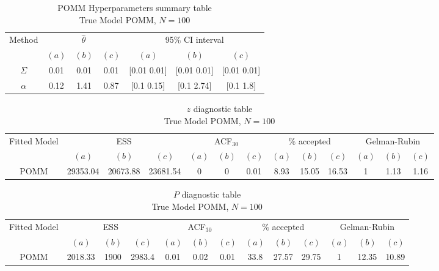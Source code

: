 \documentclass[11pt]{amsart}
\begin{document}
\begin{table}[htbp]
\centering
\caption*{
{\large POMM Hyperparameters summary table} \\ 
{\small True Model POMM, $N=100$}
} 
\begin{tabular}{ccccccc}
\toprule
\multirow{2}{*}{Method} & \multicolumn{3}{c}{
$\hat{\theta}$} & \multicolumn{3}{c}{
95$\%$ CI interval}  \\
\cmidrule(lr){2-4} \cmidrule(lr){5-7} 
& $(a)$ & $(b)$ & $(c)$ & $(a)$ & $(b)$ & $(c)$  \\
\midrule
$\Sigma$ &0.01 & 0.01 & 0.01 & [0.01	0.01] & [0.01	0.01] & [0.01	0.01]   \\
$\alpha$ & 0.12 & 1.41 & 0.87 & [0.1	0.15] & [0.1	2.74] & [0.1	1.8] \\
\bottomrule
\end{tabular}
\label{table:simulations_from_simple}
\end{table}








\begin{table}[htbp]
\centering
\caption*{
{\large $z$ diagnostic table} \\ 
{\small True Model POMM, $N=100$}
} 
\begin{tabular}{ccccccccccccc}
\toprule
\multirow{2}{*}{Fitted Model} & \multicolumn{3}{c}{ESS} & \multicolumn{3}{c}{
ACF$_{30}$} & \multicolumn{3}{c}{$\%$ accepted} & \multicolumn{3}{c}{Gelman-Rubin}\\
\cmidrule(lr){2-4} \cmidrule(lr){5-7} \cmidrule(lr){8-10} \cmidrule(lr){11-13} 
& $(a)$ & $(b)$ & $(c)$ & $(a)$ & $(b)$ & $(c)$ & $(a)$ & $(b)$ & $(c)$ & $(a)$ & $(b)$ & $(c)$ \\
\midrule
POMM &29353.04 & 20673.88 & 23681.54 & 0 & 0 & 0.01 & 8.93 & 15.05  & 16.53 & 1 & 1.13 & 1.16    \\
\bottomrule
\end{tabular}
\label{table:simulations_from_simple}
\end{table}

\begin{table}[htbp]
\centering
\caption*{
{\large $P$ diagnostic table} \\ 
{\small True Model POMM, $N=100$}
} 
\begin{tabular}{ccccccccccccc}
\toprule
\multirow{2}{*}{Fitted Model} & \multicolumn{3}{c}{ESS} & \multicolumn{3}{c}{
ACF$_{30}$} & \multicolumn{3}{c}{$\%$ accepted} & \multicolumn{3}{c}{Gelman-Rubin}\\
\cmidrule(lr){2-4} \cmidrule(lr){5-7} \cmidrule(lr){8-10} \cmidrule(lr){11-13} 
& $(a)$ & $(b)$ & $(c)$ & $(a)$ & $(b)$ & $(c)$ & $(a)$ & $(b)$ & $(c)$ & $(a)$ & $(b)$ & $(c)$ \\
\midrule
POMM &2018.33 & 1900 & 2983.4 & 0.01 & 0.02 & 0.01 & 33.8 & 27.57 & 29.75 & 1 & 12.35 & 10.89  \\
\bottomrule
\end{tabular}
\label{table:simulations_from_simple}
\end{table}
\end{document}
